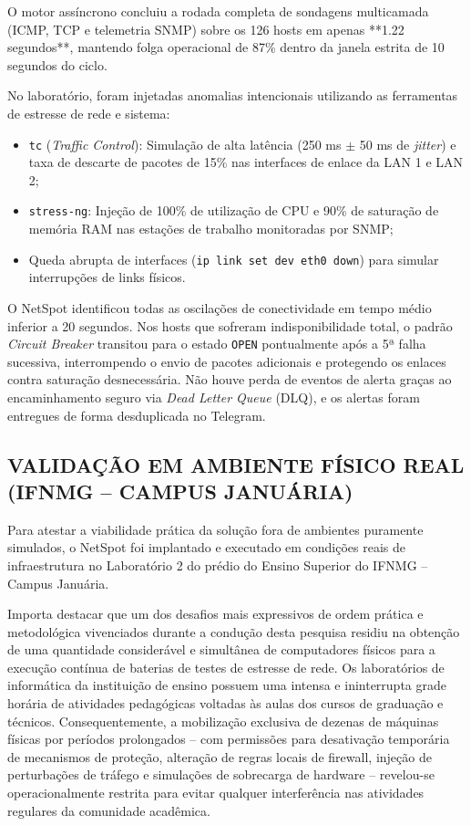 \documentclass[12pt,a4paper]{article}
\begin{document}
O motor assíncrono concluiu a rodada completa de sondagens multicamada (ICMP, TCP e telemetria SNMP) sobre os 126 hosts em apenas **1.22 segundos**, mantendo folga operacional de 87\% dentro da janela estrita de 10 segundos do ciclo.

No laboratório, foram injetadas anomalias intencionais utilizando as ferramentas de estresse de rede e sistema:
\begin{itemize}[leftmargin=1.25cm]
\item \texttt{tc} (\textit{Traffic Control}): Simulação de alta latência (250 ms $\pm$ 50 ms de \textit{jitter}) e taxa de descarte de pacotes de 15\% nas interfaces de enlace da LAN 1 e LAN 2;
\item \texttt{stress-ng}: Injeção de 100\% de utilização de CPU e 90\% de saturação de memória RAM nas estações de trabalho monitoradas por SNMP;
\item Queda abrupta de interfaces (\texttt{ip link set dev eth0 down}) para simular interrupções de links físicos.
\end{itemize}

O NetSpot identificou todas as oscilações de conectividade em tempo médio inferior a 20 segundos. Nos hosts que sofreram indisponibilidade total, o padrão \textit{Circuit Breaker} transitou para o estado \texttt{OPEN} pontualmente após a 5ª falha sucessiva, interrompendo o envio de pacotes adicionais e protegendo os enlaces contra saturação desnecessária. Não houve perda de eventos de alerta graças ao encaminhamento seguro via \textit{Dead Letter Queue} (DLQ), e os alertas foram entregues de forma desduplicada no Telegram.

\subsection{VALIDAÇÃO EM AMBIENTE FÍSICO REAL (IFNMG -- CAMPUS JANUÁRIA)}
Para atestar a viabilidade prática da solução fora de ambientes puramente simulados, o NetSpot foi implantado e executado em condições reais de infraestrutura no Laboratório 2 do prédio do Ensino Superior do IFNMG -- Campus Januária.

Importa destacar que um dos desafios mais expressivos de ordem prática e metodológica vivenciados durante a condução desta pesquisa residiu na obtenção de uma quantidade considerável e simultânea de computadores físicos para a execução contínua de baterias de testes de estresse de rede. Os laboratórios de informática da instituição de ensino possuem uma intensa e ininterrupta grade horária de atividades pedagógicas voltadas às aulas dos cursos de graduação e técnicos. Consequentemente, a mobilização exclusiva de dezenas de máquinas físicas por períodos prolongados -- com permissões para desativação temporária de mecanismos de proteção, alteração de regras locais de firewall, injeção de perturbações de tráfego e simulações de sobrecarga de hardware -- revelou-se operacionalmente restrita para evitar qualquer interferência nas atividades regulares da comunidade acadêmica.
\end{document}
